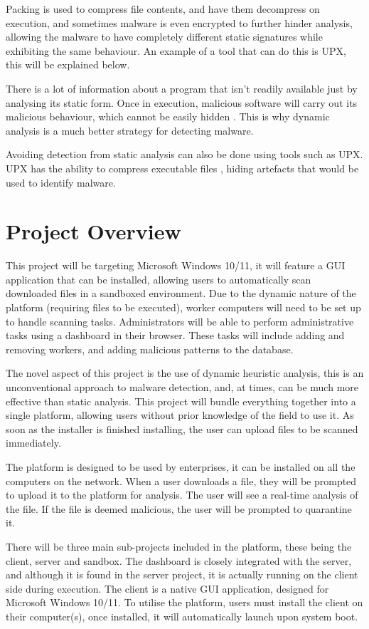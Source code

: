 Packing is used to compress file contents, and have them decompress on execution,
and sometimes malware is even encrypted to further hinder analysis,
allowing the malware to have completely different
static signatures while exhibiting the same behaviour.
An example of a tool that can do this is UPX, this will be explained below.

There is a lot of information about a program that isn't
readily available just by analysing its static form.
Once in execution, malicious software will carry out its malicious behaviour,
which cannot be easily hidden \cite{10.1145/3329786}.
This is why dynamic analysis is a much better strategy for detecting malware.

Avoiding detection from static analysis can also be done using tools such as UPX.
UPX has the ability to compress executable files \cite{upx},
hiding artefacts that would be used to identify malware.

\section{Project Overview}
This project will be targeting Microsoft Windows 10/11,
it will feature a GUI application that can be installed,
allowing users to automatically scan downloaded files in a sandboxed environment.
Due to the dynamic nature of the platform (requiring files to be executed),
worker computers will need to be set up to handle scanning tasks.
Administrators will be able to perform administrative
tasks using a dashboard in their browser.
These tasks will include adding and removing workers,
and adding malicious patterns to the database.

The novel aspect of this project is the use of dynamic heuristic analysis,
this is an unconventional approach to malware detection,
and, at times, can be much more effective than static analysis.
This project will bundle everything together into a single platform,
allowing users without prior knowledge of the field to use it.
As soon as the installer is finished installing,
the user can upload files to be scanned immediately.

The platform is designed to be used by enterprises,
it can be installed on all the computers on the network.
When a user downloads a file, they will be prompted to
upload it to the platform for analysis.
The user will see a real-time analysis of the file.
If the file is deemed malicious, the user will be prompted to quarantine it.

There will be three main sub-projects included in the platform,
these being the client, server and sandbox.
The dashboard is closely integrated with the server,
and although it is found in the server project,
it is actually running on the client side during execution.
The client is a native GUI application,
designed for Microsoft Windows 10/11.
To utilise the platform, users must install the client on their computer(s),
once installed, it will automatically launch upon system boot.

